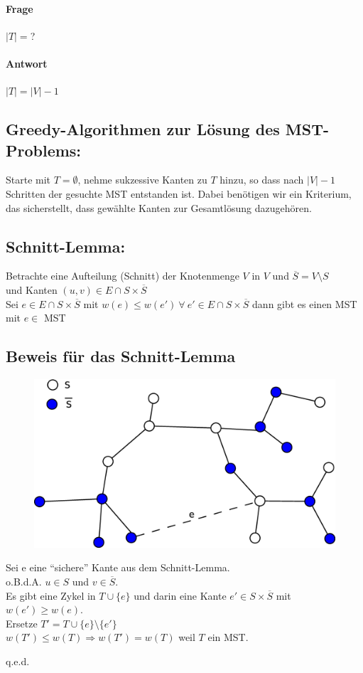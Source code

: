 \paragraph{Frage} $|T|= $?
\paragraph{Antwort} $|T| = |V|-1$
\subsection{Greedy-Algorithmen zur Lösung des MST-Problems:}
Starte mit $T=\emptyset$, nehme sukzessive Kanten zu $T$ hinzu, so dass nach $|V|-1$ Schritten der gesuchte MST entstanden ist. 
Dabei benötigen wir ein Kriterium, das sicherstellt, dass gewählte Kanten zur Gesamtlösung dazugehören.
\subsection{Schnitt-Lemma:}
Betrachte eine Aufteilung (Schnitt) der Knotenmenge $V$ in $V$ und $\overline{S} = V\setminus S$ \\und Kanten $(u,v) \in E \cap S\times \overline{S}$\\
Sei $e \in E \cap S \times \overline{S}$ mit $w(e) \leq w(e') ~\forall ~e' \in E \cap S\times \overline{S}$ dann gibt es einen MST mit $e \in$ MST
\subsection{Beweis für das Schnitt-Lemma}
\begin{figure}[h]
\centering
\includegraphics[width=0.5\linewidth]{19/Grafik/SpannbaumBeweis}
\caption{}
\label{fig:SpannbaumBeweis}
\end{figure}

Sei e eine "`sichere"' Kante aus dem Schnitt-Lemma.\\
o.B.d.A. $u\in S$ und $v \in \overline{S}$.\\
Es gibt eine Zykel in $T\cup \{e\}$ und darin eine Kante $e'\in S\times \overline{S}$ mit $w(e') \geq w(e)$.\\
Ersetze $T'=T\cup\{e\}\setminus\{ e' \}$\\
$w(T') \leq w(T) \Rightarrow w(T') = w(T)$ weil $T$ ein MST.
\begin{flushright}
	q.e.d.
\end{flushright}
